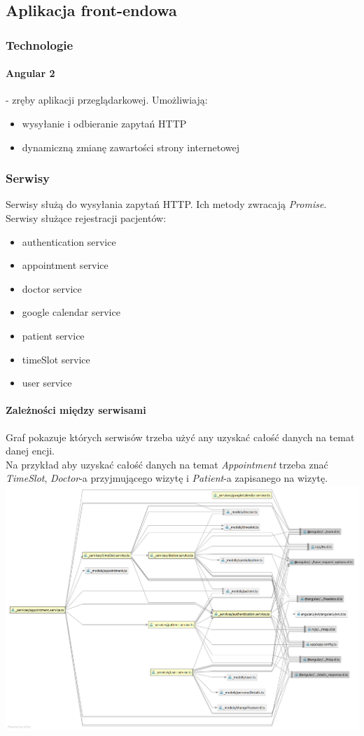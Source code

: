 \documentclass[polish,12pt]{aghthesis}
\begin{document}
\subsection{Aplikacja front-endowa}
\subsubsection{Technologie}
\paragraph{Angular 2} - zręby aplikacji przeglądarkowej. Umożliwiają:
\begin{itemize}
    \item wysyłanie i odbieranie zapytań HTTP
    \item dynamiczną zmianę zawartości strony internetowej
\end{itemize}
\subsubsection{Serwisy}
Serwisy służą do wysyłania zapytań HTTP. Ich metody zwracają \emph{Promise}. Serwisy służące rejestracji pacjentów:
\begin{itemize}
    \item authentication service
    \item appointment service
    \item doctor service
    \item google calendar service
    \item patient service
    \item timeSlot service
    \item user service
\end{itemize}
\paragraph{Zależności między serwisami}{
 Graf pokazuje których serwisów trzeba użyć any uzyskać całość danych na temat danej encji. \\
 Na przykład aby uzyskać całość danych na temat \emph{Appointment} trzeba znać \emph{TimeSlot}, \emph{Doctor}-a przyjmującego wizytę i \emph{Patient}-a zapisanego na wizytę.
 \includegraphics[width=\textwidth]{services-dep}
}
\end{document}
